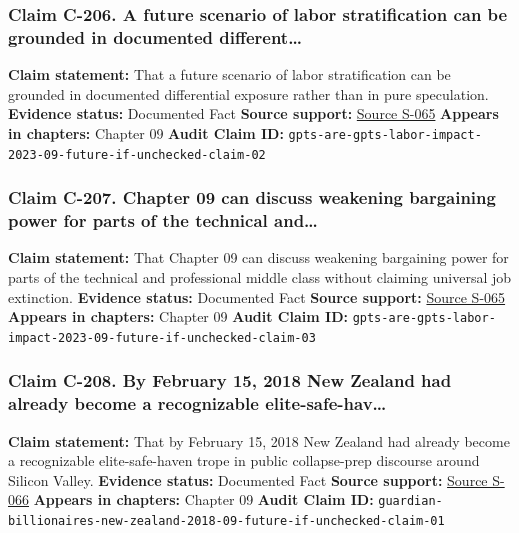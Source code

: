 \documentclass[
  american,
  11pt,
  letterpaper,
]{article}
\begin{document}
\subsubsection{Claim C-206. A future scenario of labor stratification
can be grounded in documented
different\ldots{}}\label{claim-c-206-a-future-scenario-of-labor-stratification-can-be-grounded-in-documented-different}

\textbf{Claim statement:} That a future scenario of labor stratification
can be grounded in documented differential exposure rather than in pure
speculation. \textbf{Evidence status:} Documented Fact \textbf{Source
support:}
\hyperref[source-s-065-gpts-are-gpts-an-early-look-at-the-labor-market-impact-potential-of-large-language-models]{Source
S-065} \textbf{Appears in chapters:} Chapter 09 \textbf{Audit Claim ID:}
\texttt{gpts-are-gpts-labor-impact-2023-09-future-if-unchecked-claim-02}

\subsubsection{Claim C-207. Chapter 09 can discuss weakening bargaining
power for parts of the technical
and\ldots{}}\label{claim-c-207-chapter-09-can-discuss-weakening-bargaining-power-for-parts-of-the-technical-and}

\textbf{Claim statement:} That Chapter 09 can discuss weakening
bargaining power for parts of the technical and professional middle
class without claiming universal job extinction. \textbf{Evidence
status:} Documented Fact \textbf{Source support:}
\hyperref[source-s-065-gpts-are-gpts-an-early-look-at-the-labor-market-impact-potential-of-large-language-models]{Source
S-065} \textbf{Appears in chapters:} Chapter 09 \textbf{Audit Claim ID:}
\texttt{gpts-are-gpts-labor-impact-2023-09-future-if-unchecked-claim-03}

\subsubsection{Claim C-208. By February 15, 2018 New Zealand had already
become a recognizable
elite-safe-hav\ldots{}}\label{claim-c-208-by-february-15-2018-new-zealand-had-already-become-a-recognizable-elite-safe-hav}

\textbf{Claim statement:} That by February 15, 2018 New Zealand had
already become a recognizable elite-safe-haven trope in public
collapse-prep discourse around Silicon Valley. \textbf{Evidence status:}
Documented Fact \textbf{Source support:}
\hyperref[source-s-066-why-silicon-valley-billionaires-are-prepping-for-the-apocalypse-in-new-zealand]{Source
S-066} \textbf{Appears in chapters:} Chapter 09 \textbf{Audit Claim ID:}
\texttt{guardian-billionaires-new-zealand-2018-09-future-if-unchecked-claim-01}
\end{document}
